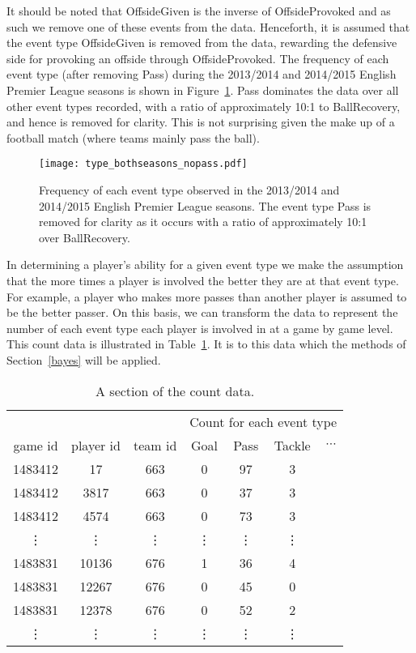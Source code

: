 \documentclass[11pt,a4paper]{article}
\begin{document}
It should be noted that OffsideGiven is the inverse of OffsideProvoked
and as such we remove one of these events from the data. Henceforth, it 
is assumed that the event type OffsideGiven is removed from the 
data, rewarding the defensive side for provoking an offside through 
OffsideProvoked. The frequency of each event type (after removing Pass) 
during the 2013/2014 and 2014/2015 English Premier League seasons 
is shown in Figure~\ref{typefig}. Pass dominates the data over all other 
event types recorded, with a ratio of approximately 10:1 to BallRecovery, 
and hence is removed for clarity. This is not surprising given the make 
up of a football match (where teams mainly pass the ball). 


\begin{figure}%
      \centering
      \texttt{[image: type\_bothseasons\_nopass.pdf]}
      \caption{Frequency of each event type observed in the 2013/2014 
      and 2014/2015 English Premier League seasons. 
      The event type Pass is removed for clarity as it occurs with a 
      ratio of approximately 10:1 over BallRecovery.} \label{typefig}
\end{figure} 

In determining a player's ability for a given event type we make the 
assumption that the more times a player is involved the better they 
are at that event type. For example, a player who makes more passes 
than another player is assumed to be the better passer. On this basis, 
we can transform the data %
to represent the number of each event type each player is involved in at 
a game by game level. This count data is illustrated in 
Table~\ref{tab-count}. It is to this data which the methods of 
Section~\ref{bayes} will be applied. 
  
 
\begin{table} 
\caption{A section of the count data.} \label{tab-count}
\centering
\begin{tabular}{ccc|cccc}
\hline
 & & & \multicolumn{4}{c}{Count for each event type} \\
game id &	player id & team id &	Goal & Pass &	Tackle &	$\cdots$\\
\hline
1483412  &	17 &	663 & 0 & 97 & 3 &    \\
1483412 &	3817 &	663 & 0 & 37 & 3 &   	\\
1483412 &	4574 &	663 & 0 & 73 & 3 &   	\\
\vdots & \vdots &\vdots &\vdots &\vdots &\vdots & \\[1.1ex]
1483831 &	10136 &	676 & 1 & 36 & 4 &    \\
1483831 &	12267 &	676 & 0 & 45 & 0 &   	\\
1483831 &	12378 &	676 & 0 & 52 & 2 &   	\\
\vdots & \vdots &\vdots &\vdots &\vdots &\vdots & \\
\hline
\end{tabular}
\end{table} 
 
\end{document}

